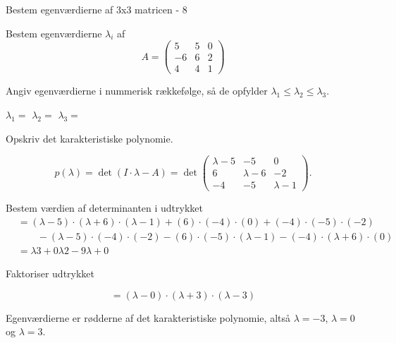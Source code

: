 \documentclass{article}
\begin{document}
\begin{exercise}{Bestem egenværdierne af 3x3 matricen - 8}

Bestem egenværdierne $\lambda_i$ af 
\[
A=\begin{pmatrix}
5 & 5 & 0 \\
-6 & 6 & 2 \\
4 & 4 & 1
\end{pmatrix}
\]

Angiv egenværdierne i nummerisk rækkefølge, så de
opfylder $\lambda_1 \le \lambda_2 \le \lambda_3$.

$\lambda_1 = $
$\lambda_2 = $
$\lambda_3 = $

\hint
Opskriv det karakteristiske polynomie.

\hint
\[
p(\lambda)=\det\left(I \cdot \lambda - A \right)=\det\begin{pmatrix}
\lambda - 5 & -5 & 0 \\
6 & \lambda - 6 & -2 \\
-4 & -5 & \lambda-1
\end{pmatrix}.
\]

\hint
Bestem værdien af determinanten i udtrykket
\begin{align*}
&=(\lambda-5) \cdot (\lambda+6) \cdot (\lambda-1)+(6) \cdot (-4) \cdot (0)+(-4) \cdot (-5) \cdot (-2) \\
& \qquad -(\lambda-5) \cdot (-4) \cdot (-2)-(6) \cdot (-5) \cdot (\lambda-1)-(-4) \cdot (\lambda+6) \cdot (0) \\
&=\lambda3+0\lambda2-9\lambda+0
\end{align*}

\hint
Faktoriser udtrykket

\hint
\[
=(\lambda-0) \cdot (\lambda+3) \cdot (\lambda-3)
\]

\hint
Egenværdierne er rødderne af det karakteristiske polynomie, 
altså
$\lambda=-3$, $\lambda=0$ og $\lambda=3$.

\end{exercise}
\end{document}
